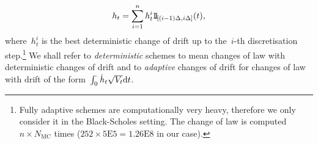 $$
h_t=\sum_{i=1}^{n} h^i_t \, \ind_{[(i-1)\Delta, i\Delta]}(t),
$$
where~$h^i_t$ is the best deterministic change of drift up to the~$i$-th discretisation step.\footnote{Fully adaptive schemes are computationally very heavy, therefore we only consider it in the Black-Scholes setting. 
The change of law is computed~$n \times N_{\text{MC}}$ times ($252 \times 5\mathrm{E}5 = 1.26\mathrm{E}8$ in our case).} %
We shall refer to \textit{deterministic} schemes
to mean changes of law with deterministic changes of drift and to \textit{adaptive} changes of drift 
for changes of law with drift of the form~$\int_0^\cdot \dot{h}_t\sqrt{V_t}\mathrm{d} t$.

